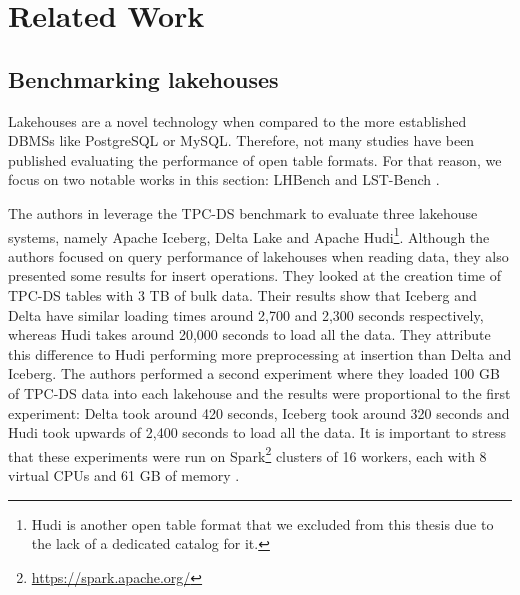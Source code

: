 \chapter{Related Work}\label{ch:related-work}

\section{Benchmarking lakehouses}
Lakehouses are a novel technology when compared to the more established DBMSs like PostgreSQL or MySQL. Therefore, not many studies have been published evaluating the performance of open table formats. For that reason, we focus on two notable works in this section: LHBench \cite{paras_jain_analyzing_2023} and LST-Bench \cite{camacho-rodriguezLSTBenchBenchmarkingLogStructured2024}. 

The authors in \cite{paras_jain_analyzing_2023} leverage the TPC-DS benchmark \cite{TPCBENCHMARKDS2024} to evaluate three lakehouse systems, namely Apache Iceberg, Delta Lake and Apache Hudi\footnote{Hudi is another open table format that we excluded from this thesis due to the lack of a dedicated catalog for it.}. Although the authors focused on query performance of lakehouses when reading data, they also presented some results for insert operations. They looked at the creation time of TPC-DS tables with 3 TB of bulk data. Their results show that Iceberg and Delta have similar loading times around 2,700 and 2,300 seconds respectively, whereas Hudi takes around 20,000 seconds to load all the data. They attribute this difference to Hudi performing more preprocessing at insertion than Delta and Iceberg. The authors performed a second experiment where they loaded 100 GB of TPC-DS data into each lakehouse and the results were proportional to the first experiment: Delta took around 420 seconds, Iceberg took around 320 seconds and Hudi took upwards of 2,400 seconds to load all the data. It is important to stress that these experiments were run on Spark\footnote{\url{https://spark.apache.org/}} clusters of 16 workers, each with 8 virtual CPUs and 61 GB of memory \cite{paras_jain_analyzing_2023}.

